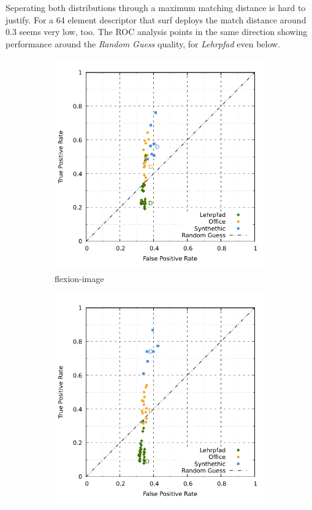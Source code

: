 Seperating both distributions through a maximum matching distance is hard to justify.
For a 64 element descriptor that \acrshort{surf} deploys the match distance around \num{0.3} seems very low, too.
The \acrshort{ROC} analysis points in the same direction showing performance around the \emph{Random Guess} quality, for \emph{Lehrpfad} even below.
\begin{figure}[H]
\begin{subfigure}[t]{0.45\linewidth}
    \includegraphics[width=\linewidth]{chapter06/results/SURF/flexion/roc.pdf}%
    \caption{\gls{flexion-image}}
\end{subfigure}\quad
\begin{subfigure}[t]{0.45\linewidth}
    \includegraphics[width=\linewidth]{chapter06/results/SURF/bearing/roc.pdf}

\end{subfigure}
\end{figure}
